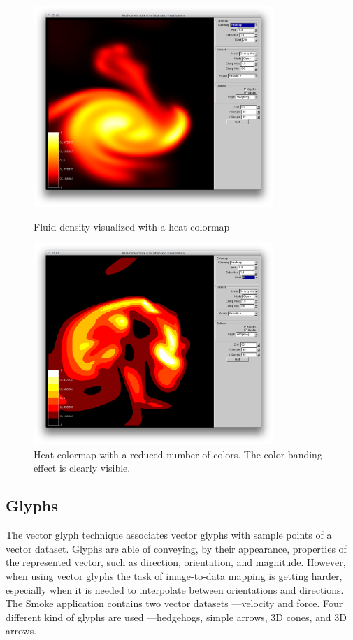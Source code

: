 \begin{figure}[htbp]
\centering
\begin{minipage}[t]{0.48\textwidth}
        \includegraphics[height=3in]{figures/colormaps/heatmapSmoke.png}
\caption{Fluid density visualized with a heat colormap}
\label{fig:heatmap}
\end{minipage}\hspace{.04\textwidth}%
\begin{minipage}[t]{0.48\textwidth}
        \includegraphics[height=3in]{figures/colormaps/heatmapSmokeBanded.png}
    \caption{Heat colormap with a reduced number of colors. The color banding effect is clearly visible.}
    \label{fig:banding}
\end{minipage}
\end{figure}

\clearpage

\subsection{Glyphs}

The vector glyph technique associates vector glyphs with sample points of a vector dataset. Glyphs are able of conveying, by their appearance, properties of the represented vector, such as direction, orientation, and magnitude. However, when using vector glyphs the task of image-to-data mapping is getting harder, especially when it is needed to interpolate between orientations and directions. The Smoke application contains two vector datasets ---velocity and force. Four different kind of glyphs are used ---hedgehogs, simple arrows, 3D cones, and 3D arrows.

